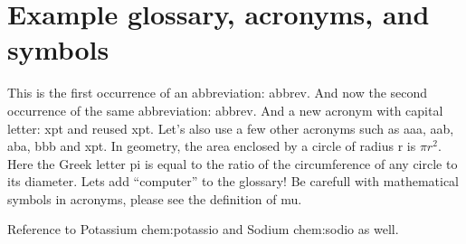 


\section{Example glossary, acronyms, and symbols}
%
%
This is the first occurrence of an abbreviation: \gls{abbrev}. And now the second occurrence of the same abbreviation: \gls{abbrev}. And a new acronym with capital letter: \Gls{xpt} and reused \gls{xpt}.  Let's also use a few other acronyms such as \gls{aaa}, \gls{aab}, \gls{aba}, \gls{bbb} and \gls{xpt}.
In geometry, the area enclosed by a circle of radius \gls{r} is $\pi r^2$. Here the Greek letter \gls{pi} is equal to the ratio of the circumference of any circle to its diameter.
Lets add ``\gls{computer}'' to the glossary! Be carefull with mathematical symbols in acronyms, please see the definition of \gls{mu}.

Reference to Potassium \gls{chem:potassio} and Sodium \gls{chem:sodio} as well.

%





\endinput


\typeout{NT FILE chapter2.tex}%

\chapter{NOVAthesis Template \emph{User's Manual}}
\label{cha:users_manual}

\glsresetall

\begin{center}
  \fbox{\LARGE
    This manual is outdated and must be revised!}
\end{center}

Referência ao Potássio é \gls{chem:potassio} e Sódio também \gls{chem:sodio}.

